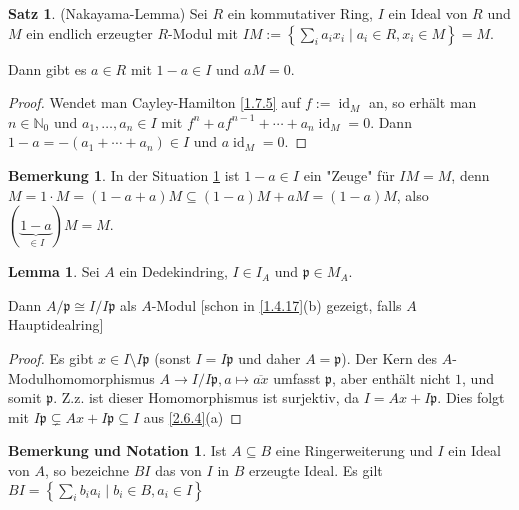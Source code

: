 \documentclass[
twoside=semi,
fontsize=12,
DIV=12, 
cleardoublepage=current,
leqno,
headings=optiontoheadandtoc, 
toc=idx
]{scrbook}
\newcommand{\N}{\mathbb{N}}
\newcommand{\set}[1]{\left\{ #1 \right\}}
\DeclareMathOperator{\id}{id}
\theoremstyle{definition}
\newtheorem{bemerkung}[definition]{Bemerkung}
\newtheorem{satz}[definition]{Satz}
\newtheorem{lemma}[definition]{Lemma}
\newtheorem{bem-not}[definition]{Bemerkung und Notation}
\begin{document}
 	\begin{satz}\label{2.7.1}
 		(Nakayama-Lemma)\newline
 		Sei $R$ ein kommutativer Ring, $I$ ein Ideal von $R$ und $M$ ein endlich erzeugter $R$-Modul mit $IM := \set{\sum_i a_ix_i \mid a_i \in R, x_i \in M} = M$.
 		
 		\medskip\noindent 
 		Dann gibt es $a \in R$ mit $1-a \in I$ und $aM = 0$.
 		
 		\begin{proof}
 			Wendet man Cayley-Hamilton \ref{1.7.5} auf $f := \id_M$ an, so erh\"alt man $n \in \N_0$ und $a_1, \dots, a_n \in I$ mit $f^n + af^{n-1} + \cdots + a_n\id_M = 0$. Dann $1-a = -(a_1 + \cdots + a_n) \in I$ und $a \id_M = 0$.
 		\end{proof}
 	\end{satz}
 
 	\begin{bemerkung}\label{2.7.2}\hfill\newline
 		In der Situation \ref{2.7.1} ist $1-a \in I$ ein "Zeuge" f\"ur $IM = M$, denn \linebreak $M = 1 \cdot M = (1-a+a)M \subseteq (1-a)M + aM = (1-a)M$, also $(\underbrace{1-a}_{\in I})M = M$.
 	\end{bemerkung}
 
 	\begin{lemma}\label{2.7.3}\hfill\newline
 		Sei $A$ ein Dedekindring, $I \in I_A$ und $\mathfrak{p} \in M_A$. 
 		
 		\medskip\noindent
 		Dann $A/\mathfrak{p} \cong I / I\mathfrak{p}$ als $A$-Modul [schon in \ref{1.4.17}(b) gezeigt, falls $A$ Hauptidealring]
 		
 		\begin{proof}
 			Es gibt $x \in I \setminus I\mathfrak{p}$ (sonst $I = I\mathfrak{p}$ und daher $A = \mathfrak{p}$). Der Kern des \linebreak $A$-Modulhomomorphismus $A\to I/I\mathfrak{p}, a \mapsto \overline{ax}$ umfasst $\mathfrak{p}$, aber enth\"alt nicht $1$, und somit $\mathfrak{p}$. Z.z. ist dieser Homomorphismus ist surjektiv, da $I = Ax + I\mathfrak{p}$. Dies folgt mit $I\mathfrak{p} \subsetneq Ax + I \mathfrak{p} \subseteq I$ aus \ref{2.6.4}(a)
 		\end{proof}
 	\end{lemma}
 
 	\begin{bem-not}\label{2.7.4}\hfill\newline
 		Ist $A\subseteq B$ eine Ringerweiterung und $I$ ein Ideal von $A$, so bezeichne $BI$ das von $I$ in $B$ erzeugte Ideal. Es gilt $\displaystyle BI = \set{\sum_i b_ia_i \mid b_i \in B, a_i \in I}$
 	\end{bem-not}
 	
\end{document}
